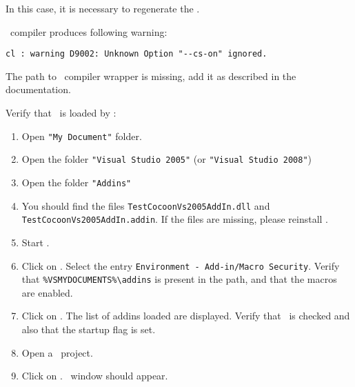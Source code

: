 In this case, it is necessary to regenerate the \QtLibrary.

\VisualStudio\ compiler produces following warning:
\begin{verbatim}
cl : warning D9002: Unknown Option "--cs-on" ignored.
\end{verbatim}

The path to \CoverageScanner\ compiler wrapper is missing, add it as described in the documentation. 

Verify that \VisualStudioVsAddIn\ is loaded by \VisualStudio:
\begin{enumerate}
\item Open \verb$"My Document"$ folder.
\item Open the folder \verb$"Visual Studio 2005"$ (or \verb$"Visual Studio 2008"$)
\item Open the folder \verb$"Addins"$
\item You should find the files \verb$TestCocoonVs2005AddIn.dll$ and \verb$TestCocoonVs2005AddIn.addin$. If the files are missing, please reinstall \TestCocoon.
\item Start \VisualStudio.
\item Click on . Select the entry \verb$Environment - Add-in/Macro Security$. Verify that \verb$%VSMYDOCUMENTS%\addins$ is present in the path, and that the macros are enabled.
\item Click on . The list of addins loaded are displayed. Verify that \TestCocoon\ is checked and also that the startup flag is set. \newline
{}
\item Open a \CorCPlusPlus\ project.
\item Click on . \VisualStudioVsAddIn\ window should appear.
\end{enumerate}


